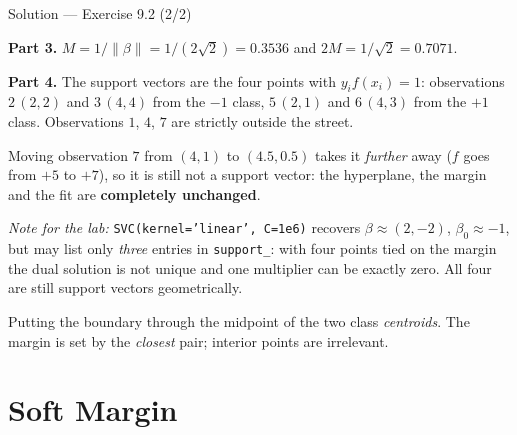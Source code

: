 \documentclass[aspectratio=169,11pt]{beamer}
\begin{document}
\begin{frame}{Solution --- Exercise 9.2 (2/2)}
\begin{solutionbox}
  \scriptsize
  \textbf{Part 3.}
  $M=1/\|\beta\|=1/(2\sqrt2)=0.3536$ and $2M = 1/\sqrt2 = 0.7071$.

  \textbf{Part 4.} The support vectors are the four points with
  $y_if(x_i)=1$: observations $2\,(2,2)$ and $3\,(4,4)$ from the $-1$ class,
  $5\,(2,1)$ and $6\,(4,3)$ from the $+1$ class. Observations $1$, $4$, $7$
  are strictly outside the street.

  Moving observation $7$ from $(4,1)$ to $(4.5,0.5)$ takes it \emph{further}
  away ($f$ goes from $+5$ to $+7$), so it is still not a support vector: the
  hyperplane, the margin and the fit are \textbf{completely unchanged}.

  \textit{Note for the lab:} \texttt{SVC(kernel='linear', C=1e6)} recovers
  $\beta\approx(2,-2)$, $\beta_0\approx-1$, but may list only \emph{three}
  entries in \texttt{support\_}: with four points tied on the margin the dual
  solution is not unique and one multiplier can be exactly zero. All four are
  still support vectors geometrically.
\end{solutionbox}
\begin{mistake}
  Putting the boundary through the midpoint of the two class \emph{centroids}.
  The margin is set by the \emph{closest} pair; interior points are irrelevant.
\end{mistake}
\end{frame}

\section{Soft Margin}
\end{document}
